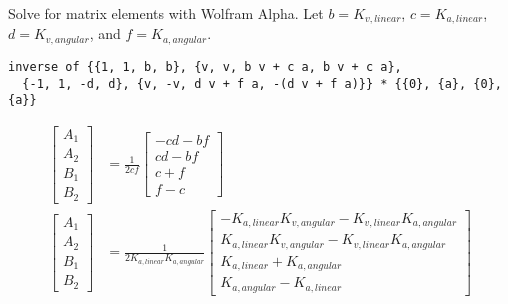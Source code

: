 Solve for matrix elements with Wolfram Alpha. Let
$b = K_{v,linear}$, $c = K_{a,linear}$, $d = K_{v,angular}$, and $f = K_{a,angular}$.
\begin{verbatim}
inverse of {{1, 1, b, b}, {v, v, b v + c a, b v + c a},
  {-1, 1, -d, d}, {v, -v, d v + f a, -(d v + f a)}} * {{0}, {a}, {0}, {a}}
\end{verbatim}
\begin{align*}
  \begin{bmatrix}
    A_1 \\
    A_2 \\
    B_1 \\
    B_2
  \end{bmatrix} &= \frac{1}{2cf}
  \begin{bmatrix}
    -cd - bf \\
    cd - bf \\
    c + f \\
    f - c
  \end{bmatrix} \\
  \begin{bmatrix}
    A_1 \\
    A_2 \\
    B_1 \\
    B_2
  \end{bmatrix} &= \frac{1}{2 K_{a,linear} K_{a,angular}}
  \begin{bmatrix}
    -K_{a,linear} K_{v,angular} - K_{v,linear} K_{a,angular} \\
    K_{a,linear} K_{v,angular} - K_{v,linear} K_{a,angular} \\
    K_{a,linear} + K_{a,angular} \\
    K_{a,angular} - K_{a,linear}
  \end{bmatrix}
\end{align*}


